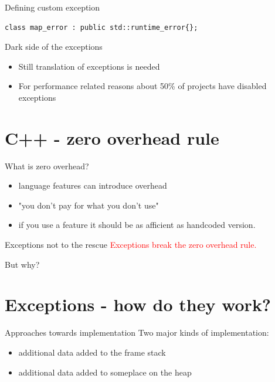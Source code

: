 \documentclass[10pt]{beamer}
\begin{document}
\begin{frame}[fragile]{Defining custom exception}
	\begin{verbatim}
class map_error : public std::runtime_error{};
	\end{verbatim}
\end{frame}

\begin{frame}[fragile]{Dark side of the exceptions}
	\begin{itemize}[<+- | alert@+>]
		\item Still translation of exceptions is needed
		\item For performance related reasons about 50\% of projects have disabled exceptions
	\end{itemize}
\end{frame}

\section{C++ - zero overhead rule}

\begin{frame}{What is zero overhead?}
	\begin{itemize}[<+- | alert@+>]
		\item language features {\color{amethyst}can} introduce overhead
		\item "you don't pay for what you don't use"
		\item if you use a feature it should be as afficient as handcoded version.
	\end{itemize}
\end{frame}

\begin{frame}{Exceptions not to the rescue}
		\centering
		\textcolor{red}{Exceptions break the zero overhead rule.}
		
		But why?
\end{frame}

\section{Exceptions - how do they work?}

\begin{frame}{Approaches towards implementation}
	Two major kinds of implementation:
	\begin{itemize}[<+- | alert@+>]
		\item additional data added to the frame stack
		\item additional data added to someplace on the heap
	\end{itemize}
\end{frame}
	
\end{document}
